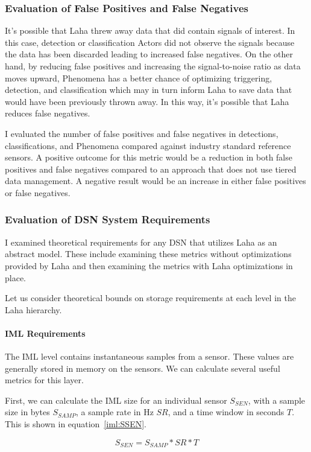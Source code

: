 \subsubsection{Evaluation of False Positives and False Negatives}\label{eval-fp-fn}
It's possible that Laha threw away data that did contain signals of interest. In this case, detection or classification Actors did not observe the signals because the data has been discarded leading to increased false negatives. On the other hand, by reducing false positives and increasing the signal-to-noise ratio as data moves upward, Phenomena has a better chance of optimizing triggering, detection, and classification which may in turn inform Laha to save data that would have been previously thrown away. In this way, it's possible that Laha reduces false negatives.

I evaluated the number of false positives and false negatives in detections, classifications, and Phenomena compared against industry standard reference sensors. A positive outcome for this metric would be a reduction in both false positives and false negatives compared to an approach that does not use tiered data management. A negative result would be an increase in either false positives or false negatives.

\subsubsection{Evaluation of DSN System Requirements}
I examined theoretical requirements for any DSN that utilizes Laha as an abstract model. These include examining these metrics without optimizations provided by Laha and then examining the metrics with Laha optimizations in place.

Let us consider theoretical bounds on storage requirements at each level in the Laha hierarchy.

\paragraph{IML Requirements}
The IML level contains instantaneous samples from a sensor. These values are generally stored in memory on the sensors. We can calculate several useful metrics for this layer.

First, we can calculate the IML size for an individual sensor $S_{SEN}$, with a sample size in bytes $S_{SAMP}$, a sample rate in Hz $SR$, and a time window in seconds $T$. This is shown in equation~\ref{iml:SSEN}.

\begin{equation}\label{iml:SSEN}
	S_{SEN} = S_{SAMP} * SR * T
\end{equation}

